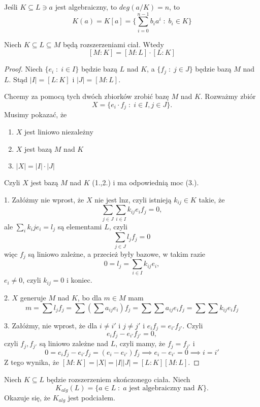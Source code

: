Jeśli $K\subseteq L\ni a$ jest algebraiczny, to $deg(a/K)=n$, to 
$$K(a)=K[a]=\{\sum\limits_{i=0}^{n-1}b_ia^i\;:\;b_i\in K\}$$

\begin{fact}[$dim_K(M)=dim_L(M)\cdot dim_K(L)$]\label{fakt:4:6}
    Niech $K\subseteq L\subseteq M$ będą rozszerzeniami ciał. Wtedy 
    $$[M:K]=[M:L]\cdot [L:K]$$
\end{fact}

\begin{proof}

Niech $\{e_i\;:\;i\in I\}$ będzie bazą $L$ nad $K$, a $\{f_j\;:\;j\in J\}$ będzie bazą $M$ nad $L$. Stąd $|I|=[L:K]$ i $|J|=[M:L]$.

Chcemy za pomocą tych dwóch zbiorków zrobić bazę $M$ nad $K$. Rozważmy zbiór
$$X=\{e_i\cdot f_j\;:\;i\in I,j\in J\}.$$
Musimy pokazać, że 
\begin{enumerate}
    \item $X$ jest liniowo niezależny
    \item $X$ jest bazą $M$ nad $K$
    \item $|X|=|I|\cdot|J|$
\end{enumerate}

Czyli $X$ jest bazą $M$ nad $K$ (1.,2.) i ma odpowiednią moc (3.).

1. Załóżmy nie wprost, że $X$ nie jest lnz, czyli istnieją $k_{ij}\in K$ takie, że
$$\sum\limits_{j\in J}\sum\limits_{i\in I}k_{ij}e_if_j=0,$$
ale $\sum\limits_ik_ije_i=l_j$ są elementami $L$, czyli
$$\sum\limits_{j\in J}l_jf_j=0$$
więc $f_j$ są liniowo zależne, a przecież były bazowe, w takim razie
$$0=l_j=\sum\limits_{i\in I}k_{ij}e_i,$$
$e_i\neq0$, czyli $k_{ij}=0$ i koniec.

2. $X$ generuje $M$ nad $K$, bo dla $m\in M$ mam
$$m=\sum l_jf_j=\sum\left(\sum a_{ij}e_i\right)f_j=\sum\sum a_{ij}e_if_j=\sum \sum k_{ij}e_if_j$$

3. Załóżmy, nie wprost, że dla $i\neq i'$ i $j\neq j'$ i $e_if_j=e_{i'}f_{j'}$. Czyli
$$e_if_j-e_{i'}f_{j'}=0,$$
czyli $f_j,f_{j'}$ są liniowo zależne nad $L$, czyli mamy, że $f_j=f_{j'}$ i
$$0=e_if_j-e_{i'}f_{j}=(e_i-e_{i'})f_j\implies e_i-e_{i'}=0\implies i=i'$$
Z tego wynika, że $[M:K]=|X|=|I||J|=[L:K][M:L]$.
\end{proof}
\begin{conclusion}
    Niech $K\subseteq L$ będzie rozszerzeniem skończonego ciała. Niech 
    $$K_{alg}(L)=\{a\in L\;:\;a\text{ jest algebraiczny nad }K\}.$$
    Okazuje się, że $K_{alg}$ jest podciałem.
\end{conclusion}

